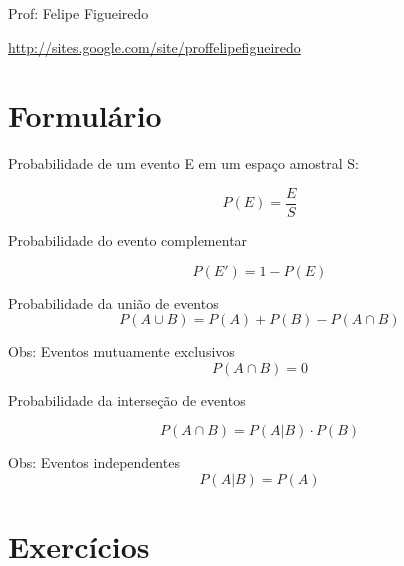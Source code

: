 \documentclass[a4paper]{article}
\begin{document}
\parbox[c]{.825\textwidth}{\raggedright%
{Prof: Felipe Figueiredo\par}
{\url{http://sites.google.com/site/proffelipefigueiredo}}

\vspace{1cm}
}


\section{Formulário}

Probabilidade de um evento E em um espaço amostral S:

\begin{displaymath}
  P(E) = \frac{E}{S}
\end{displaymath}

Probabilidade do evento complementar

\begin{displaymath}
  P(E') = 1 - P(E)
\end{displaymath}


Probabilidade da união de eventos
\begin{displaymath}
  P(A \cup B) = P(A) + P(B) - P (A \cap B)
\end{displaymath}

Obs: Eventos mutuamente exclusivos
\begin{displaymath}
  P(A \cap B) = 0
\end{displaymath}

Probabilidade da interseção de eventos

\begin{displaymath}
  P(A \cap B) = P(A|B) \cdot P(B)
\end{displaymath}

Obs: Eventos independentes
\begin{displaymath}
  P(A|B) = P(A)
\end{displaymath}
\section{Exercícios}
\end{document}
